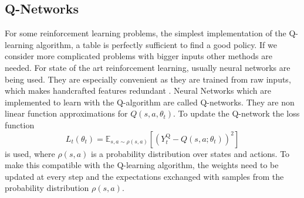 \subsection{Q-Networks}
For some reinforcement learning problems, the simplest implementation of the Q-learning algorithm, a table is perfectly sufficient to find a good policy.
If we consider more complicated problems with bigger inputs other methods are needed. For state of the art reinforcement learning, usually neural networks are being used.
They are especially convenient as they are trained from raw inputs, which makes handcrafted features redundant \cite{DBLP:journals/corr/MnihKSGAWR13}.
Neural Networks which are implemented to learn with the Q-algorithm are called Q-networks.
They are non linear function approximations for $Q(s,a,\theta_t)$.
To update the Q-network the loss function
\begin{equation}
L_{t}\left(\theta_{t}\right)=\mathbb{E}_{s, a \sim \rho(s,a)}\left[\left(Y_{t}^{\mathrm{Q}}-Q\left(s, a ; \theta_{t}\right)\right)^{2}\right]
\end{equation}
is used, where $\rho(s, a)$ is a probability distribution over states and actions. To make this compatible with the Q-learning algorithm, the weights need to be updated at every step and the expectations exchanged with samples from the probability distribution $\rho(s,a)$.
